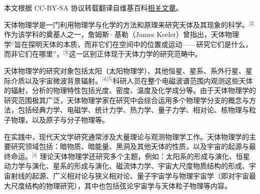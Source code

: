 
本文根据 CC-BY-SA 协议转载翻译自维基百科\href{https://en.wikipedia.org/wiki/Astrophysics?utm_source=chatgpt.com}{相关文章}。


天体物理学是一门利用物理学与化学的方法和原理来研究天体及其现象的科学。\(^\text{[2]}\)作为该学科的奠基人之一，詹姆斯·基勒（James Keeler）曾指出，天体物理学“旨在探明天体的本质，而非它们在空间中的位置或运动——研究它们是什么，而非它们在哪里”，\(^\text{[3]}\)这一区别正体现于天体力学的研究范畴中。

天体物理学的研究对象包括太阳（太阳物理学）、其他恒星、星系、系外行星、星际介质以及宇宙微波背景辐射。\(^\text{[4][5]}\)科研人员在整个电磁波谱范围内观测这些天体的辐射，分析的物理特性包括光度、密度、温度及化学成分等。由于天体物理学的研究范围极其广泛，天体物理学家在研究中会综合运用多个物理学分支的概念与方法，包括经典力学、电磁学、统计力学、热力学、量子力学、相对论、核物理与粒子物理，以及原子与分子物理等。

在实践中，现代天文学研究通常涉及大量理论与观测物理学工作。天体物理学的主要研究领域包括：暗物质、暗能量、黑洞及其他天体的性质，以及宇宙的起源与最终命运。\(^\text{[4]}\)
理论天体物理学还研究多个主题，例如：太阳系的形成与演化、恒星动力学与演化、星系的形成与演化、磁流体力学、宇宙大尺度物质结构的形成、宇宙射线的起源、广义相对论与狭义相对论、量子宇宙学与物理宇宙学（即对宇宙最大尺度结构的物理研究），其中也包括弦论宇宙学与天体粒子物理等内容。
